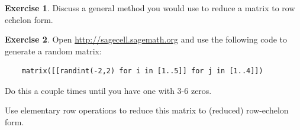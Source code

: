 \documentclass[handout]{beamer}
\theoremstyle{definition}
\newtheorem{exercise}{Exercise}
\begin{document}
\begin{frame}[fragile]
	\frametitle{\insertframenumber}
\begin{exercise}
	Discuss a general method you would use to reduce a matrix to row echelon form.
\end{exercise}
\begin{exercise}
	Open \url{http://sagecell.sagemath.org} and use the following code to generate a random matrix:
	
	\begin{verbatim}
	matrix([[randint(-2,2) for i in [1..5]] for j in [1..4]])
	\end{verbatim}

	Do this a couple times until you have one with 3-6 zeros.
	
	Use elementary row operations to reduce this matrix to (reduced) row-echelon form.
\end{exercise}
\end{frame}
\end{document}
